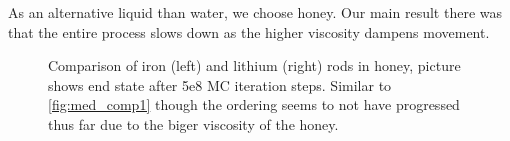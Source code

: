 As an alternative liquid than water, we choose honey. Our main result there was that the entire process slows down as the higher viscosity dampens movement.
\begin{figure}
  \begin{minipage}[t]{0.45\textwidth}
  \end{minipage}
  \hfill
  \begin{minipage}[t]{0.45\textwidth}
  \end{minipage}
  \caption{Comparison of iron (left) and lithium (right) rods in honey, picture shows end state after 5e8 MC iteration steps. Similar to \ref{fig:med_comp1} though the ordering seems to not have progressed thus far due to the biger viscosity of the honey.}
  \label{fig:med_comp3}
\end{figure}
